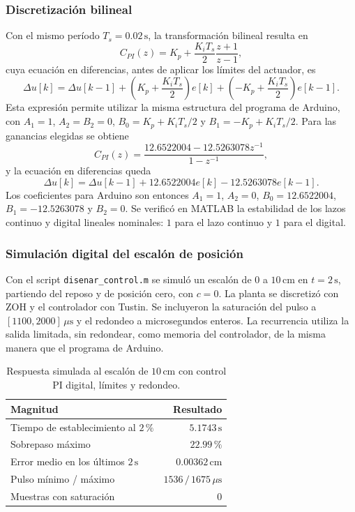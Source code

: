 \documentclass[a4paper, twoside, 10pt, spanish]{article}
\numberwithin{table}{section}
\begin{document}
    \subsubsection{Discretización bilineal}

    Con el mismo período $T_s=0.02\,\text{s}$, la transformación bilineal resulta en
    \[
        C_{PI}(z)=K_p+\frac{K_iT_s}{2}\frac{z+1}{z-1},
    \]
    cuya ecuación en diferencias, antes de aplicar los límites del actuador, es
    \begin{equation}
        \Delta u[k]=\Delta u[k-1]
        +\left(K_p+\frac{K_iT_s}{2}\right)e[k]
        +\left(-K_p+\frac{K_iT_s}{2}\right)e[k-1].
        \label{eq:pi_discreto}
    \end{equation}
    Esta expresión permite utilizar la misma estructura del programa de Arduino, con $A_1=1$, $A_2=B_2=0$, $B_0=K_p+K_iT_s/2$ y $B_1=-K_p+K_iT_s/2$. Para las ganancias elegidas se obtiene
    \[
        C_{PI}(z)=\frac{12.6522004-12.5263078z^{-1}}{1-z^{-1}},
    \]
    y la ecuación en diferencias queda
    \[
        \Delta u[k]=\Delta u[k-1]+12.6522004e[k]-12.5263078e[k-1].
    \]
    Los coeficientes para Arduino son entonces $A_1=1$, $A_2=0$, $B_0=12.6522004$, $B_1=-12.5263078$ y $B_2=0$. Se verificó en MATLAB la estabilidad de los lazos continuo y digital lineales nominales: $1$ para el lazo continuo y $1$ para el digital.

    \subsubsection{Simulación digital del escalón de posición}
    Con el script \texttt{disenar\_control.m} se simuló un escalón de $0$ a $10\,\text{cm}$ en $t=2\,\text{s}$, partiendo del reposo y de posición cero, con $c=0$. La planta se discretizó con ZOH y el controlador con Tustin. Se incluyeron la saturación del pulso a $[1100,2000]\,\mu\text{s}$ y el redondeo a microsegundos enteros. La recurrencia utiliza la salida limitada, sin redondear, como memoria del controlador, de la misma manera que el programa de Arduino.

    \begin{table}[H]
        \centering
        \caption{Respuesta simulada al escalón de $10\,\text{cm}$ con control PI digital, límites y redondeo.}
        \label{tab:pi_escalon_simulado}
        \begin{tabular}{lr}
            \toprule
            Magnitud & Resultado \\
            \midrule
            Tiempo de establecimiento al $2\,\%$ & $5.1743\,\text{s}$ \\
            Sobrepaso máximo & $22.99\,\%$ \\
            Error medio en los últimos $2\,\text{s}$ & $0.00362\,\text{cm}$ \\
            Pulso mínimo / máximo & $1536\,/\,1675\,\mu\text{s}$ \\
            Muestras con saturación & $0$ \\
            \bottomrule
        \end{tabular}
    \end{table}
\end{document}
